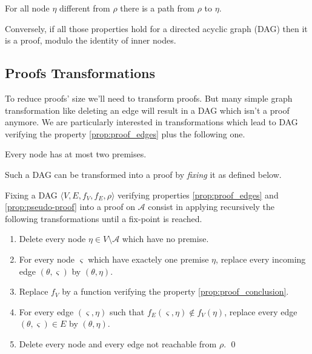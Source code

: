 \documentclass{llncs}
\begin{document}
\begin{property}
For all node $\eta$ different from $\rho$ there is a path from $\rho$ to $\eta$.
\end{property}

Conversely, if all those properties hold for a directed acyclic graph (DAG) then it is a proof,
modulo the identity of inner nodes.

\subsection{Proofs Transformations}

To reduce proofs' size we'll need to transform proofs. But many simple graph transformation like
deleting an edge will result in a DAG which isn't a proof anymore. We are particularly interested in
transformations which lead to DAG verifying the property \ref{prop:proof_edges} plus the following one.

\begin{property}
\label{prop:pseudo-proof}
Every node has at most two premises.
\end{property}

Such a DAG can be transformed into a proof by \emph{fixing} it as defined below.

\begin{definition}[Fixing]
Fixing a DAG $\langle V, E, f_V, f_E, \rho \rangle$ verifying properties \ref{prop:proof_edges} and
\ref{prop:pseudo-proof} into a proof on $\mathcal{A}$ consist in applying recursively the following
transformations until a fix-point is reached.
\begin{enumerate}
  \item Delete every node $\eta \in V \setminus \mathcal{A}$ which have no premise.
  \item For every node $\varsigma$ which have exactely one premise $\eta$, replace every incoming
    edge $(\theta,\varsigma)$ by $(\theta,\eta)$.
  \item Replace $f_V$ by a function verifying the property \ref{prop:proof_conclusion}.
  \item For every edge $(\varsigma,\eta)$ such that $f_E(\varsigma,\eta) \notin f_V(\eta)$, replace
    every edge $(\theta,\varsigma) \in E$ by $(\theta,\eta)$.
  \item Delete every node and every edge not reachable from $\rho$.
  \qed
\end{enumerate}
\end{definition}
\end{document}
